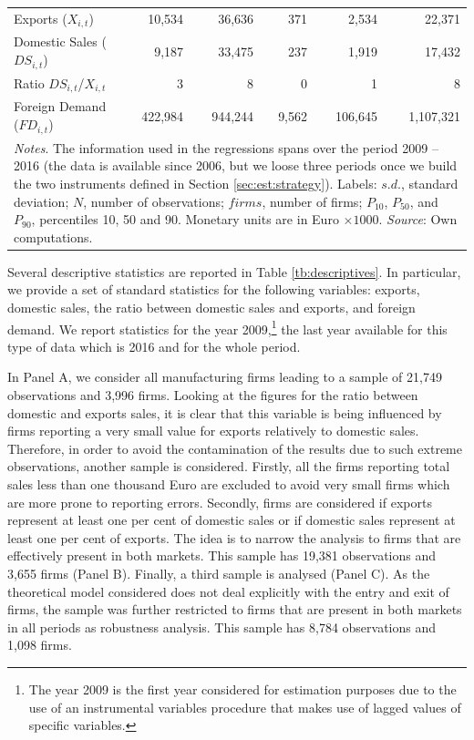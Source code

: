 \documentclass[a4paper,12pt]{article}
\begin{document}
\begin{table}[ht]
{\begin{tabular}{lrrrrr}
			Exports ($X_{i,t}$) & 10,534 & 36,636 & 371 & 2,534 & 22,371 \\
			Domestic Sales ($DS_{i,t}$) & 9,187 & 33,475 & 237 & 1,919 & 17,432 \\
			Ratio $DS_{i,t}$/$X_{i,t}$ & 3 & 8 & 0 & 1 & 8 \\
			Foreign Demand ($FD_{i,t}$) & 422,984 & 944,244 & 9,562 & 106,645 & 1,107,321 \\
			\hline\hline
			\multicolumn{6}{p{13.7cm}}{\textit{Notes}. The information used in the regressions spans over the period 2009 -- 2016 (the data is available since 2006, but we loose three periods once we build the two instruments defined in Section \ref{sec:est:strategy}). Labels: $s.d.$, standard deviation; $N$, number of observations; $firms$, number of firms; $P_{10}$, $P_{50}$, and $P_{90}$, percentiles 10, 50 and 90. Monetary units are in Euro $\times 1000$. \newline
				\textit{Source}: Own computations.}
	\end{tabular}}
\end{table}


Several descriptive statistics are reported in Table \ref{tb:descriptives}. In particular, we provide a set of standard statistics for the following variables: exports, domestic sales, the ratio between domestic sales and exports, and foreign demand. We report statistics for the year 2009,\footnote{The year 2009 is the first year considered for estimation purposes due to the use of an instrumental variables procedure that makes use of lagged values of specific variables.} the last year available for this type of data which is 2016 and for the whole period. 

In Panel A, we consider all manufacturing firms leading to a sample of 21,749 observations and 3,996 firms. Looking at the figures for the ratio between domestic and exports sales, it is clear that this variable is being influenced by firms reporting a very small value for exports relatively to domestic sales. Therefore, in order to avoid the contamination of the results due to such extreme observations, another sample is considered. Firstly, all the firms reporting total sales less than one thousand Euro are excluded to avoid very small firms which are more prone to reporting errors. Secondly, firms are considered if exports represent at least one per cent of domestic sales or if domestic sales represent at least one per cent of exports. The idea is to narrow the analysis to firms that are effectively present in both markets. This sample has 19,381 observations and 3,655 firms (Panel B).  
Finally, a third sample is analysed (Panel C). As the theoretical model considered does not deal explicitly with the entry and exit of firms, the sample was further restricted to firms that are present in both markets in all periods as robustness analysis. This sample has 8,784 observations and 1,098 firms.
\end{document}
